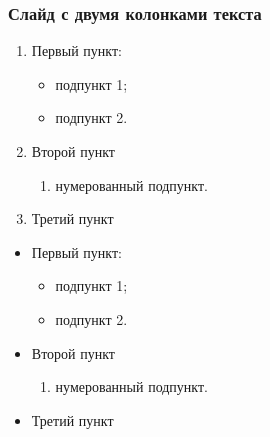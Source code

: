 \documentclass{beamer}
\begin{document}
\begin{frame}
\frametitle{Слайд с двумя колонками текста}
	\begin{multicols}{2}
			\begin{enumerate} 
		\item Первый пункт:
		\begin{itemize}
			\item подпункт 1;
			\item подпункт 2.
		\end{itemize}
		\item Второй пункт
		\begin{enumerate}
			\item нумерованный подпункт.
		\end{enumerate} 
		\item Третий пункт
	\end{enumerate} 
	\columnbreak
	\begin{itemize}
		\item Первый пункт:
		\begin{itemize}
			\item подпункт 1;
			\item подпункт 2.
		\end{itemize}
		\item Второй пункт
		\begin{enumerate}
			\item нумерованный подпункт.
		\end{enumerate}
		\item Третий пункт
	\end{itemize}
	\end{multicols}
\end{frame}
\end{document}
